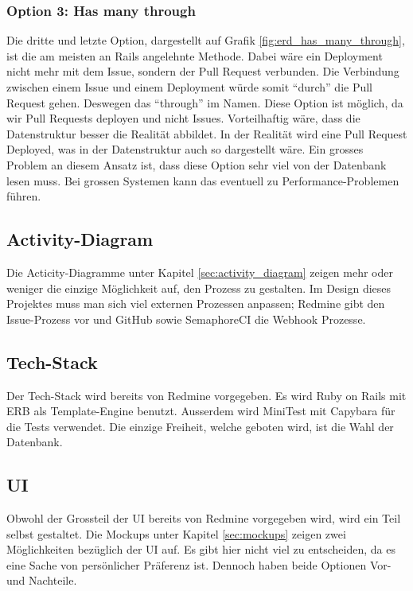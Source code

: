 \subsubsection{Option 3: Has many through}
\label{sec:decide_has_many_through}
Die dritte und letzte Option, dargestellt auf Grafik \ref{fig:erd_has_many_through}, ist die am meisten an Rails angelehnte
Methode. Dabei wäre ein Deployment nicht mehr mit dem Issue, sondern der Pull Request verbunden. Die Verbindung zwischen
einem Issue und einem Deployment würde somit \enquote{durch} die Pull Request gehen. Deswegen das \enquote{through} im Namen.
Diese Option ist möglich, da wir Pull Requests deployen und nicht Issues. \newline
Vorteilhaftig wäre, dass die Datenstruktur besser die Realität abbildet. In der Realität wird eine Pull Request Deployed,
was in der Datenstruktur auch so dargestellt wäre. \newline
Ein grosses Problem an diesem Ansatz ist, dass diese Option sehr viel von der Datenbank lesen muss. Bei grossen Systemen
kann das eventuell zu Performance-Problemen führen.

\subsection{Activity-Diagram}
Die Acticity-Diagramme unter Kapitel \ref{sec:activity_diagram} zeigen mehr oder weniger die einzige Möglichkeit auf, den
Prozess zu gestalten. Im Design dieses Projektes muss man sich viel externen Prozessen anpassen; Redmine gibt den
Issue-Prozess vor und GitHub sowie SemaphoreCI die Webhook Prozesse.

\subsection{Tech-Stack}
Der Tech-Stack wird bereits von Redmine vorgegeben. Es wird Ruby on Rails mit ERB als Template-Engine benutzt. Ausserdem
wird MiniTest mit Capybara für die Tests verwendet. \newline
Die einzige Freiheit, welche geboten wird, ist die Wahl der Datenbank.

\subsection{UI}
Obwohl der Grossteil der UI bereits von Redmine vorgegeben wird, wird ein Teil selbst gestaltet. Die Mockups unter Kapitel
\ref{sec:mockups} zeigen zwei Möglichkeiten bezüglich der UI auf. \newline
Es gibt hier nicht viel zu entscheiden, da es eine Sache von persönlicher Präferenz ist. Dennoch haben beide Optionen
Vor- und Nachteile.

